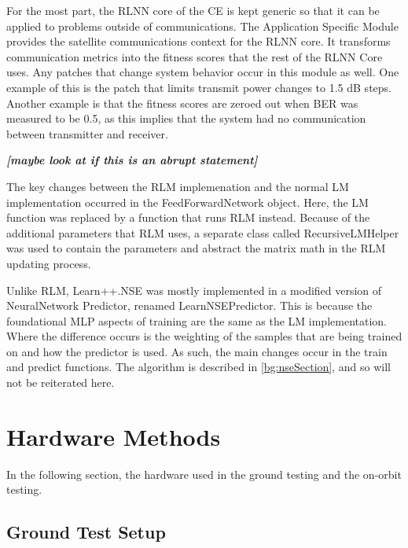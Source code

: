\par For the most part, the RLNN core of the CE is kept generic so that it can be applied to problems outside of communications. The Application Specific Module provides the satellite communications context for the RLNN core. It transforms communication metrics into the fitness scores that the rest of the RLNN Core uses. Any patches that change system behavior occur in this module as well. One example of this is the patch that limits transmit power changes to 1.5 dB steps. Another example is that the fitness scores are zeroed out when BER was measured to be 0.5, as this implies that the system had no communication between transmitter and receiver. 
\par \textit{\textbf{[maybe look at if this is an abrupt statement]}}
\par The key changes between the RLM implemenation and the normal LM implementation occurred in the FeedForwardNetwork object. Here, the LM function was replaced by a function that runs RLM instead. Because of the additional parameters that RLM uses, a separate class called RecursiveLMHelper was used to contain the parameters and abstract the matrix math in the RLM updating process.

\par Unlike RLM, Learn++.NSE was mostly implemented in a modified version of NeuralNetwork Predictor, renamed LearnNSEPredictor. This is because the foundational MLP aspects of training are the same as the LM implementation. Where the difference occurs is the weighting of the samples that are being trained on and how the predictor is used. As such, the main changes occur in the train and predict functions. The algorithm is described in \ref{bg:nseSection}, and so will not be reiterated here.
\section{Hardware Methods}\label{methods:hardware}
\par In the following section, the hardware used in the ground testing and the on-orbit testing.
\subsection{Ground Test Setup}

